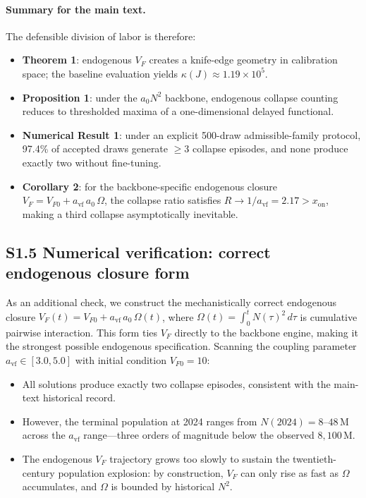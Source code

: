 \documentclass[11pt]{article}
\begin{document}
\paragraph{Summary for the main text.}
The defensible division of labor is therefore:
\begin{itemize}[leftmargin=2em]
\item \textbf{Theorem 1}: endogenous \(V_F\) creates a knife-edge geometry in calibration space;
the baseline evaluation yields \(\kappa(J)\approx 1.19\times10^5\).
\item \textbf{Proposition 1}: under the \(a_0N^2\) backbone, endogenous collapse counting reduces to
thresholded maxima of a one-dimensional delayed functional.
\item \textbf{Numerical Result 1}: under an explicit 500-draw admissible-family protocol, 97.4\%
of accepted draws generate \(\ge 3\) collapse episodes, and none produce exactly two without
fine-tuning.
\item \textbf{Corollary 2}: for the backbone-specific endogenous closure \(V_F=V_{F0}+a_{\mathrm{vf}}\,a_0\,\Omega\), the collapse ratio satisfies \(R\to 1/a_{\mathrm{vf}}=2.17>x_{\mathrm{on}}\), making a third collapse asymptotically inevitable.
\end{itemize}

\subsection*{S1.5 Numerical verification: correct endogenous closure form}

As an additional check, we construct the mechanistically correct endogenous closure $V_F(t) = V_{F0} + a_{\mathrm{vf}}\,a_0\,\Omega(t)$, where $\Omega(t) = \int_0^t N(\tau)^2\,d\tau$ is cumulative pairwise interaction.
This form ties $V_F$ directly to the backbone engine, making it the strongest possible endogenous specification.
Scanning the coupling parameter $a_{\mathrm{vf}} \in [3.0, 5.0]$ with initial condition $V_{F0} = 10$:

\begin{itemize}[leftmargin=2em]
\item All solutions produce exactly two collapse episodes, consistent with the main-text historical record.
\item However, the terminal population at 2024 ranges from $N(2024) = 8$--$48$\,M across the $a_{\mathrm{vf}}$ range---three orders of magnitude below the observed $8{,}100$\,M.
\item The endogenous $V_F$ trajectory grows too slowly to sustain the twentieth-century population explosion: by construction, $V_F$ can only rise as fast as $\Omega$ accumulates, and $\Omega$ is bounded by historical $N^2$.
\end{itemize}
\end{document}
